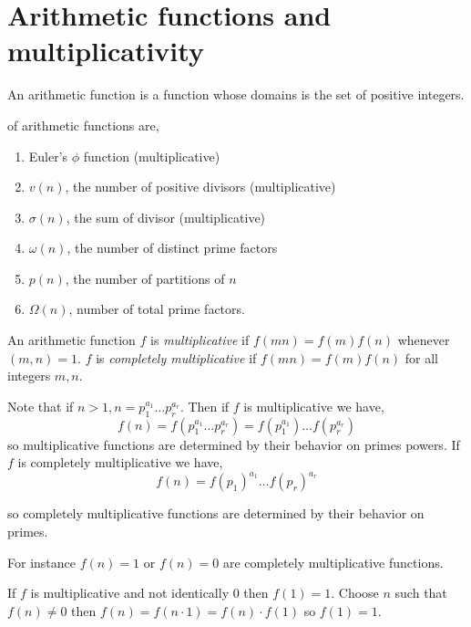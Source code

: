 \chapter{Arithmetic functions and multiplicativity}
\begin{definition}
An arithmetic function is a function whose domains is the set of positive integers.
\end{definition}
\begin{eg} of arithmetic functions are,

	\begin{enumerate}
		\item Euler's $\phi$ function (multiplicative)
		\item $v(n)$, the number of positive divisors (multiplicative)
		\item $\sigma(n)$, the sum of divisor (multiplicative)
		\item $\omega(n)$, the number of distinct prime factors
		\item $p(n)$, the number of partitions of $n$
		\item $\Omega(n)$, number of total prime factors.
	\end{enumerate}
\end{eg}

\begin{definition}
	An arithmetic function $f$ is \emph{multiplicative} if $f(mn) = f(m)f(n)$ whenever $(m, n) = 1$. $f$ is \emph{completely multiplicative} if $f(mn) = f(m)f(n)$ for all integers $m, n$.
\end{definition}

\begin{note}
	Note that if $n > 1, n = p_{1}^{a_{1}} \dots p_r^{a_r}$. Then if $f$ is multiplicative we have,
	$$
	f(n) = f(p_{1}^{a_{1}} \dots p_r^{a_r}) = f(p_{1}^{a_{1}}) \dots f(p_r^{a_r})
	$$
	so multiplicative functions are determined by their behavior on primes powers. If $f$ is completely multiplicative we have,
	$$
	f(n)  = f(p_{1})^{a_{1}} \dots f(p_r)^{a_r}
	$$

	so completely multiplicative functions are determined by their behavior on primes.

\end{note}

\begin{eg}
	For instance $f(n) = 1$ or $f(n) = 0$ are completely multiplicative functions.
\end{eg}
\begin{remark}
If $f$ is multiplicative and not identically $0$ then $f(1) = 1$. Choose $n$ such that $f(n)  \ne 0$ then $f(n) = f(n \cdot 1) = f(n) \cdot f(1)$ so $f(1) = 1$.
\end{remark}
